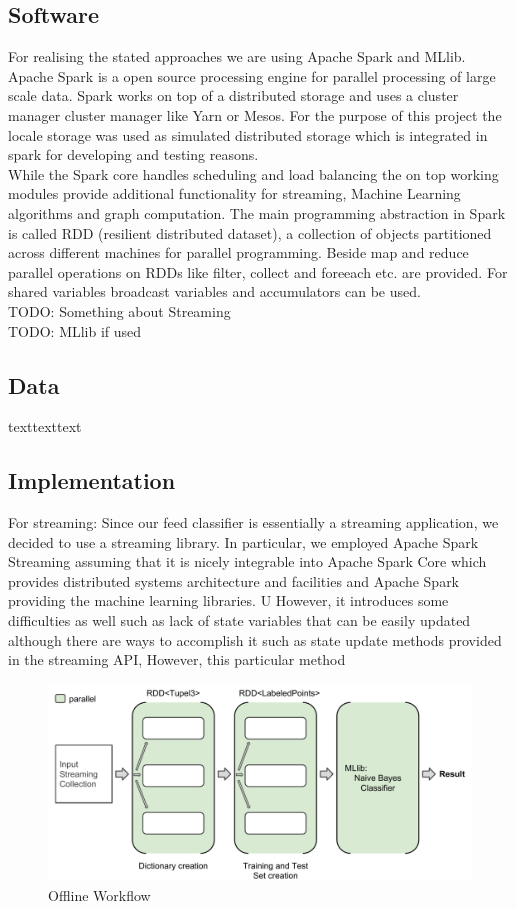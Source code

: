 \documentclass[12pt]{article}
\begin{document}
\subsection{Software}
For realising the stated approaches we are using Apache Spark and MLlib. Apache Spark is a open source processing engine for parallel processing of large scale data. Spark works on top of a distributed storage and uses a cluster manager cluster manager like Yarn or Mesos. For the purpose of this project the locale storage was used as simulated distributed storage which is integrated in spark for developing and testing reasons.  \\
While the Spark core handles scheduling and load balancing the on top working modules provide additional functionality for streaming, Machine Learning  algorithms and graph computation. The main programming abstraction in Spark is called RDD (resilient distributed dataset), a collection of objects partitioned across different machines for parallel programming. Beside map and reduce parallel operations on RDDs like filter, collect and foreeach etc. are provided. For shared variables broadcast variables and  accumulators can be used.
\\ 
TODO: Something about Streaming
\\
TODO: MLlib if used


\subsection{Data}
texttexttext

\newpage
\subsection{Implementation}

For streaming:
Since our feed classifier is essentially a streaming application, we decided to use a streaming library. In particular, we employed Apache Spark Streaming assuming that it is nicely integrable into Apache Spark Core which provides distributed systems architecture and facilities and Apache Spark providing the machine learning libraries. U
However, it introduces some difficulties as well such as lack of state variables that can be easily updated although there are ways to accomplish it such as state update methods provided in the streaming API, However, this particular method

\begin{figure}[htbp]
  \centering
  \includegraphics[scale=0.56]{VisualisationOfflineWorkflow.pdf}
  \caption{Offline Workflow}
\end{figure}
\end{document}
